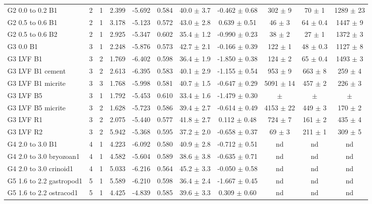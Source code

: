 \documentclass{article}
\begin{document}
\begin{sidewaystable}[htbp]
\begin{tabular}{ | l | c | c | c | c | c | c | c | c | c | c | }
G2 0.0 to 0.2 B1 & 2 & 1 & 2.399 & -5.692 & 0.584 & 40.0 $\pm$ 3.7 & -0.462 $\pm$ 0.68 & 302 $\pm$ 9 & 70 $\pm$ 1 & 1289 $\pm$ 23 \\
G2 0.5 to 0.6 B1 & 2 & 1 & 3.178 & -5.123 & 0.572 & 43.0 $\pm$ 2.8 & 0.639 $\pm$ 0.51 & 46 $\pm$ 3 & 64 $\pm$ 0.4 & 1447 $\pm$ 9 \\
G2 0.5 to 0.6 B2 & 2 & 1 & 2.925 & -5.347 & 0.602 & 35.4 $\pm$ 1.2 & -0.990 $\pm$ 0.23 & 38 $\pm$ 2 & 27 $\pm$ 1 & 1372 $\pm$ 3 \\
G3 0.0 B1 & 3 & 1 & 2.248 & -5.876 & 0.573 & 42.7 $\pm$ 2.1 & -0.166 $\pm$ 0.39 & 122 $\pm$ 1 & 48 $\pm$ 0.3 & 1127 $\pm$ 8 \\
G3 LVF B1 & 3 & 2 & 1.769 & -6.402 & 0.598 & 36.4 $\pm$ 1.9 & -1.850 $\pm$ 0.38 & 124 $\pm$ 2 & 65 $\pm$ 0.4 & 1493 $\pm$ 3 \\
G3 LVF B1 cement & 3 & 2 & 2.613 & -6.395 & 0.583 & 40.1 $\pm$ 2.9 & -1.155 $\pm$ 0.54 & 953 $\pm$ 9 & 663 $\pm$ 8 & 259 $\pm$ 4 \\
G3 LVF B1 micrite & 3 & 3 & 1.768 & -5.998 & 0.581 & 40.7 $\pm$ 1.5 & -0.647 $\pm$ 0.29 & 5091 $\pm$ 14 & 457 $\pm$ 2 & 226 $\pm$ 3 \\
G3 LVF B5 & 3 & 1 & 1.792 & -5.453 & 0.610 & 33.4 $\pm$ 1.6 & -1.479 $\pm$ 0.30 &  $\pm$  &  $\pm$  &  $\pm$  \\
G3 LVF B5 micrite & 3 & 2 & 1.628 & -5.723 & 0.586 & 39.4 $\pm$ 2.7 & -0.614 $\pm$ 0.49 & 4153 $\pm$ 22 & 449 $\pm$ 3 & 170 $\pm$ 2 \\
G3 LVF R1 & 3 & 2 & 2.075 & -5.440 & 0.577 & 41.8 $\pm$ 2.7 & 0.112 $\pm$ 0.48 & 724 $\pm$ 7 & 161 $\pm$ 2 & 435 $\pm$ 4 \\
G3 LVF R2 & 3 & 2 & 5.942 & -5.368 & 0.595 & 37.2 $\pm$ 2.0 & -0.658 $\pm$ 0.37 & 69 $\pm$ 3 & 211 $\pm$ 1 & 309 $\pm$ 5 \\
G4 2.0 to 3.0 B1 & 4 & 1 & 4.223 & -6.092 & 0.580 & 40.9 $\pm$ 2.8 & -0.712 $\pm$ 0.51 &  nd  &  nd  &  nd  \\
G4 2.0 to 3.0 bryozoan1 & 4 & 1 & 4.582 & -5.604 & 0.589 & 38.6 $\pm$ 3.8 & -0.635 $\pm$ 0.71 &  nd  &  nd  &  nd  \\
G4 2.0 to 3.0 crinoid1 & 4 & 1 & 5.033 & -6.216 & 0.564 & 45.2 $\pm$ 3.3 & -0.050 $\pm$ 0.58 &  nd  &  nd  &  nd  \\
G5 1.6 to 2.2 gastropod1 & 5 & 1 & 5.589 & -6.210 & 0.598 & 36.4 $\pm$ 2.4 & -1.667 $\pm$ 0.45 &  nd  &  nd  &  nd  \\
G5 1.6 to 2.2 ostracod1 & 5 & 1 & 4.425 & -4.839 & 0.585 & 39.6 $\pm$ 3.3 & 0.309 $\pm$ 0.60 &  nd  &  nd  &  nd  \\

\end{tabular}
\end{sidewaystable}
\end{document}
